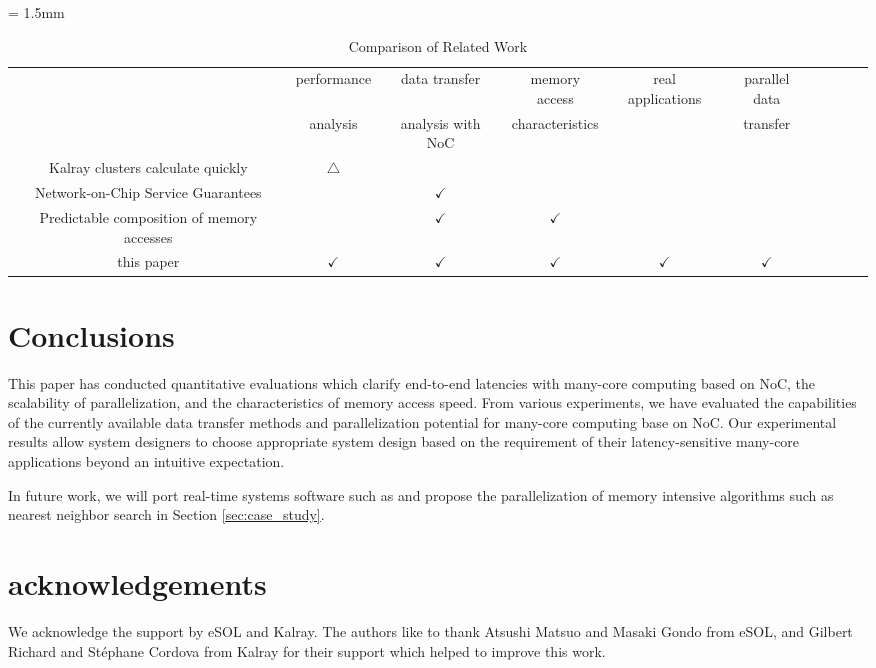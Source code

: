 \documentclass{sig-alternate-05-2015}
\begin{document}
\renewcommand{\arraystretch}{1.5}
\begin{table}[t]
  \caption{\label{tb:comparison_relatedwork}
    Comparison of Related Work}
  \centering
  \scriptsize	                    %
  \tabcolsep = 1.5mm              %
  \begin{tabular}{c|ccccccccc}
    \hline
    & performance & data transfer & memory access & \multirow{2}{*}{real applications} & parallel data & \\
    & analysis & analysis with NoC & characteristics & & transfer & \\
    \hline
    \hline
    Kalray clusters calculate quickly \cite{kanter2015kalray} & \(\bigtriangleup\) &  &  &  &  & \\
    Network-on-Chip Service Guarantees \cite{denet2017work} &  & \(\checkmark\) &  &  &  & \\
    Predictable composition of memory accesses \cite{perret2016predictable} &  & \(\checkmark\) & \(\checkmark\) &  &  & \\
    this paper & \(\checkmark\) & \(\checkmark\) & \(\checkmark\) & \(\checkmark\) & \(\checkmark\) & \\
    \hline
  \end{tabular}
  \vspace{-5mm}
\end{table}


\section{Conclusions}
\label{sec:conclusion}
This paper has conducted quantitative evaluations which clarify end-to-end latencies with many-core computing based on NoC, the scalability of parallelization, and the characteristics of memory access speed.
From various experiments, we have evaluated the capabilities of the currently available data transfer methods and parallelization potential for many-core computing base on NoC.
Our experimental results allow system designers to choose appropriate system design based on the requirement of their latency-sensitive many-core applications beyond an intuitive expectation.

In future work, we will port real-time systems software such as \cite{maruyama2016ros2} and propose the parallelization of memory intensive algorithms such as nearest neighbor search in Section \ref{sec:case_study}.

\section{acknowledgements}
\label{sec:acknowledgements}
We acknowledge the support by eSOL and Kalray.
The authors like to thank Atsushi Matsuo and Masaki Gondo from eSOL, and Gilbert Richard and Stéphane Cordova from Kalray for their support which helped to improve this work.


\end{document}
